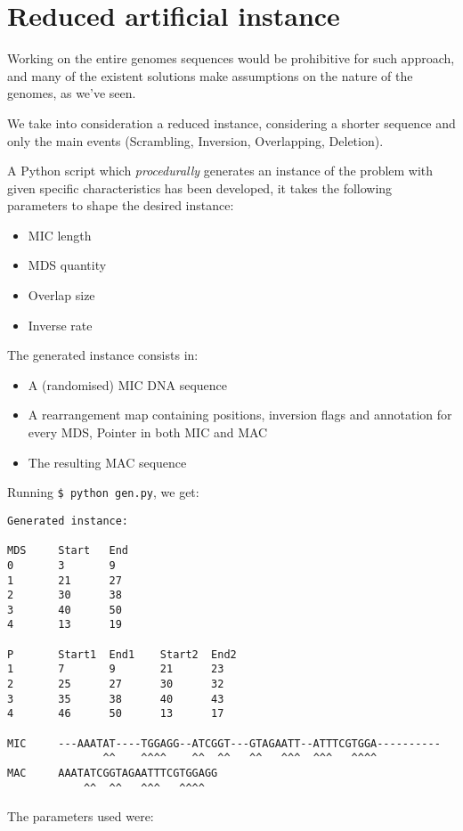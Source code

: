 \section{Reduced artificial instance}
\label{gen}

Working on the entire genomes sequences would be prohibitive for such approach, and many of the existent solutions make assumptions on the nature of the genomes, as we've seen.

We take into consideration a reduced instance, considering a shorter sequence and only the main events (Scrambling, Inversion, Overlapping, Deletion).

A Python script which \textit{procedurally} generates an instance of the problem with given specific characteristics has been developed, it takes the following parameters to shape the desired instance:

\begin{itemize}
	\item MIC length
	\item MDS quantity
	\item Overlap size
	\item Inverse rate
\end{itemize}

The generated instance consists in:

\begin{itemize}
	\item A (randomised) MIC DNA sequence
	\item A rearrangement map containing positions, inversion flags and annotation for every MDS, Pointer in both MIC and MAC
	\item The resulting MAC sequence
\end{itemize}

Running \texttt{\$ python gen.py}, we get:
\begin{verbatim}
Generated instance:

MDS     Start   End
0       3       9
1       21      27
2       30      38
3       40      50
4       13      19

P       Start1  End1    Start2  End2
1       7       9       21      23
2       25      27      30      32
3       35      38      40      43
4       46      50      13      17

MIC     ---AAATAT----TGGAGG--ATCGGT---GTAGAATT--ATTTCGTGGA----------
               ^^    ^^^^    ^^  ^^   ^^   ^^^  ^^^   ^^^^
MAC     AAATATCGGTAGAATTTCGTGGAGG
            ^^  ^^   ^^^   ^^^^
\end{verbatim}
The parameters used were:

